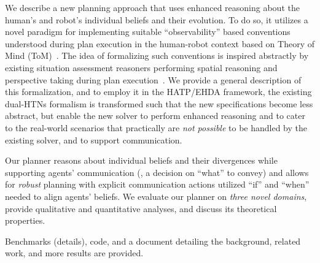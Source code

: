 \documentclass[letterpaper]{article} %
\begin{document}
We describe a new planning approach that uses enhanced reasoning about the human's and robot's individual beliefs and their evolution. 
To do so, it utilizes a novel paradigm for implementing suitable ``observability'' based conventions understood during plan execution in the human-robot context based on Theory of Mind (ToM)~\cite{devin2016implemented}. 
The idea of formalizing such conventions is inspired abstractly by existing situation assessment reasoners performing spatial reasoning and perspective taking during plan execution~\cite{flavell1992perspectives,trafton2005enabling,johnson2005perceptual,Sisbot2011SituationAF,warnier-2012,lemaignan-2017}.
% 
We provide a general description of this formalization, and to employ it in the HATP/EHDA framework, the existing dual-HTNs formalism is transformed such that the new specifications become less abstract, but enable the new solver to perform enhanced reasoning and to cater to the real-world scenarios that practically are \textit{not possible} to be handled by the existing solver, and to support 
communication.

Our planner reasons about individual beliefs and their divergences while supporting agents' communication (, a decision on ``what'' to convey) and allows for \textit{robust} planning with explicit communication actions utilized ``if'' and ``when'' needed to align agents' beliefs. 
We evaluate our planner on \textit{three novel domains}, provide qualitative and quantitative analyses, and discuss its theoretical properties.   

Benchmarks (details), code, and a document detailing the background, related work, and more results are provided.


\end{document}
